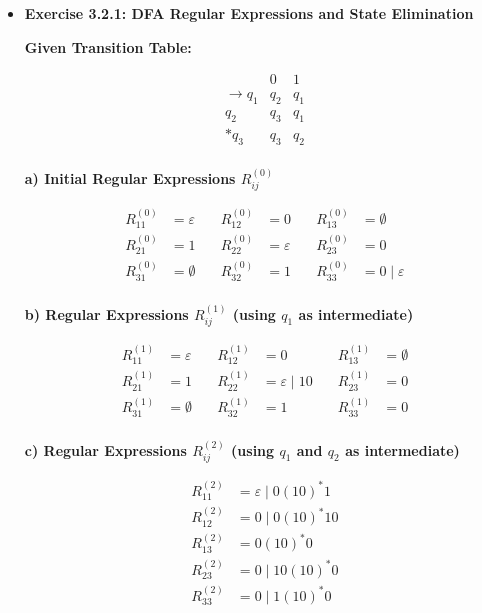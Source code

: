 \documentclass[11pt]{article}
\begin{document}
\begin{itemize}[leftmargin=*]

\item \textbf{Exercise 3.2.1: DFA Regular Expressions and State Elimination}

\textbf{Given Transition Table:}

\[
\begin{array}{c|cc}
    & 0 & 1 \\
    \hline
    \rightarrow q_1 & q_2 & q_1 \\
    q_2 & q_3 & q_1 \\
    *q_3 & q_3 & q_2 \\
\end{array}
\]

\textbf{a) Initial Regular Expressions \( R^{(0)}_{ij} \)}

\[
\begin{aligned}
R^{(0)}_{11} &= \varepsilon &\quad R^{(0)}_{12} &= 0 &\quad R^{(0)}_{13} &= \emptyset \\
R^{(0)}_{21} &= 1 &\quad R^{(0)}_{22} &= \varepsilon &\quad R^{(0)}_{23} &= 0 \\
R^{(0)}_{31} &= \emptyset &\quad R^{(0)}_{32} &= 1 &\quad R^{(0)}_{33} &= 0 \mid \varepsilon \\
\end{aligned}
\]

\textbf{b) Regular Expressions \( R^{(1)}_{ij} \) (using \( q_1 \) as intermediate)}

\[
\begin{aligned}
R^{(1)}_{11} &= \varepsilon &\quad R^{(1)}_{12} &= 0 &\quad R^{(1)}_{13} &= \emptyset \\
R^{(1)}_{21} &= 1 &\quad R^{(1)}_{22} &= \varepsilon \mid 10 &\quad R^{(1)}_{23} &= 0 \\
R^{(1)}_{31} &= \emptyset &\quad R^{(1)}_{32} &= 1 &\quad R^{(1)}_{33} &= 0 \\
\end{aligned}
\]

\textbf{c) Regular Expressions \( R^{(2)}_{ij} \) (using \( q_1 \) and \( q_2 \) as intermediate)}

\[
\begin{aligned}
R^{(2)}_{11} &= \varepsilon \mid 0(10)^*1 \\
R^{(2)}_{12} &= 0 \mid 0(10)^*10 \\
R^{(2)}_{13} &= 0(10)^*0 \\
R^{(2)}_{23} &= 0 \mid 10(10)^*0 \\
R^{(2)}_{33} &= 0 \mid 1(10)^*0 \\
\end{aligned}
\]


\end{itemize}
\end{document}
